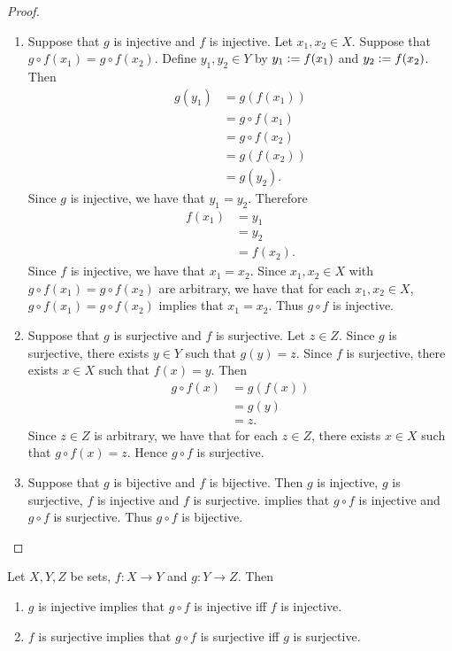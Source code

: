 \documentclass{book}
\begin{document}
	\begin{proof}\
		\begin{enumerate}
			\item Suppose that $g$ is injective and $f$ is injective. Let $x_1, x_2 \in X$. Suppose that $g \circ f(x_1) = g \circ f(x_2)$. Define $y_1,y_2 \in Y$ by $y_1 \vcentcolon= f(x_1)$ and $y_2 \vcentcolon= f(x_2)$. Then 
			\begin{align*}
				g(y_1)
				& = g(f(x_1)) \\
				& = g \circ f(x_1) \\
				& = g \circ f(x_2) \\
				& = g(f(x_2)) \\
				& = g(y_2).
			\end{align*}
			Since $g$ is injective, we have that $y_1 = y_2$. Therefore
			\begin{align*}
				f(x_1)
				& = y_1 \\
				& = y_2 \\
				& = f(x_2).
			\end{align*}
			Since $f$ is injective, we have that $x_1 = x_2$. Since $x_1, x_2 \in X$ with $g \circ f(x_1) = g \circ f(x_2)$ are arbitrary, we have that for each $x_1, x_2 \in X$, $g \circ f(x_1) = g \circ f(x_2)$ implies that $x_1 = x_2$. Thus $g \circ f$ is injective.  
			\item Suppose that $g$ is surjective and $f$ is surjective. Let $z \in Z$. Since $g$ is surjective, there exists $y \in Y$ such that $g(y) = z$. Since $f$ is surjective, there exists $x \in X$ such that $f(x) = y$. Then 
			\begin{align*}
				g \circ f(x)
				& = g(f(x)) \\
				& = g(y) \\
				& = z.
			\end{align*}
			Since $z \in Z$ is arbitrary, we have that for each $z \in Z$, there exists $x \in X$ such that $g \circ f(x) = z$. Hence $g \circ f$ is surjective.
			\item 
			Suppose that $g$ is bijective and $f$ is bijective. Then $g$ is injective, $g$ is surjective, $f$ is injective and $f$ is surjective.  implies that $g \circ f$ is injective and $g \circ f$ is surjective. Thus $g \circ f$ is bijective.
		\end{enumerate}
	\end{proof}
	
	\begin{ex}
		Let $X,Y,Z$ be sets, $f:X \rightarrow Y$ and $g:Y \rightarrow Z$. Then
		\begin{enumerate}
			\item $g$ is injective implies that $g \circ f$ is injective iff $f$ is injective.
			\item $f$ is surjective implies that $g \circ f$ is surjective iff $g$ is surjective.
		\end{enumerate}
	\end{ex}
	
\end{document}
